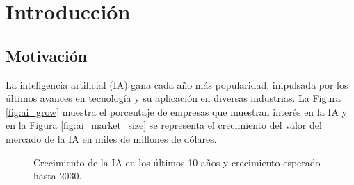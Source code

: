 \chapter{Introducción} \label{ch:intro}

\section{Motivación}

La inteligencia artificial (IA) gana cada año más popularidad, impulsada por los últimos avances en tecnología y su aplicación en diversas industrias. La Figura \ref{fig:ai_grow} muestra el porcentaje de empresas que muestran interés en la IA y en la Figura \ref{fig:ai_market_size} se representa el crecimiento del valor del mercado de la IA en miles de millones de dólares.

\begin{figure}[htb]
  \begin{subcaptiongroup}
  \begin{floatrow}
  \end{floatrow}
  \end{subcaptiongroup}
  \caption{Crecimiento de la IA en los últimos 10 años y crecimiento esperado hasta 2030.}%
\end{figure}

